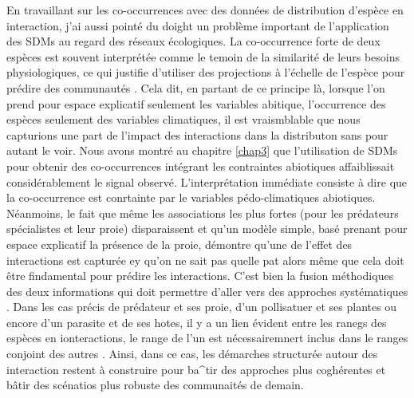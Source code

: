 En travaillant sur les co-occurrences avec des données de distribution
d'espèce en interaction, j'ai aussi pointé du doight un problème
important de l'application des SDMs au regard des réseaux écologiques.
La co-occurrence forte de deux espèces est souvent interprétée comme le
temoin de la similarité de leurs besoins physiologiques, ce qui justifie
d'utiliser des projections à l'échelle de l'espèce pour prédire des
communautés \citep{Rehfeldt2006, Albouy2012}. Cela dit, en partant de ce
principe là, lorsque l'on prend pour espace explicatif seulement les
variables abitique, l'occurrence des espèces seulement des variables
climatiques, il est vraismblable que nous capturions une part de
l'impact des interactions dans la distributon sans pour autant le voir.
Nous avons montré au chapitre \ref{chap3} que l'utilisation de SDMs pour
obtenir des co-occurrences intégrant les contraintes abiotiques
affaiblissait considérablement le signal observé. L'interprétation
immédiate consiste à dire que la co-occurrence est conrtainte par le
variables pédo-climatiques abiotiques. Néanmoins, le fait que même les
associations les plus fortes (pour les prédateurs spécialistes et leur
proie) disparaissent et qu'un modèle simple, basé prenant pour espace
explicatif la présence de la proie, démontre qu'une de l'effet des
interactions est capturée ey qu'on ne sait pas quelle pat alors même que
cela doit être findamental pour prédire les interactions. C'est bien la
fusion méthodiques des deux informations qui doit permettre d'aller vers
des approches systématiques \citep{Meier2010}. Dans les cas précis de
prédateur et ses proie, d'un pollisatuer et ses plantes ou encore d'un
parasite et de ses hotes, il y a un lien évident entre les ranegs des
espèces en ionteractions, le range de l'un est nécessairemnert inclus
dans le ranges conjoint des autres \citep{Holt2009, Shenbrot2007}.
Ainsi, dans ce cas, les démarches structurée autour des interaction
restent à construire pour ba\^{}tir des approches plus coghérentes et
bâtir des scénatios plus robuste des communaités de demain.

